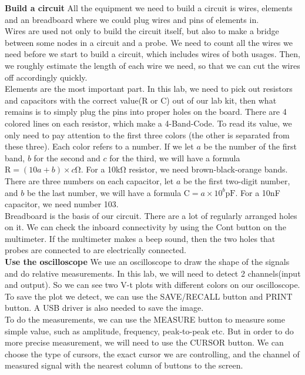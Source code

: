 \textbf{Build a circuit} \newline
\phantom{ } All the equipment we need to build a circuit is wires, elements and an breadboard where we could plug wires and pins of elements in.\\
\phantom{ } Wires are used not only to build the circuit itself, but also to make a bridge between some nodes in a circuit and a probe. We need to count all the wires we need before we start to build a circuit, which includes wires of both usages. Then, we roughly estimate the length of each wire we need, so that we can cut the wires off accordingly quickly.\\
\phantom{ } Elements are the most important part. In this lab, we need to pick out resistors and capacitors with the correct value(R or C) out of our lab kit, then what remains is to simply plug the pins into proper holes on the board. There are 4 colored lines on each resistor, which make a 4-Band-Code. To read its value, we only need to pay attention to the first three colors (the other is separated from these three). Each color refers to a number. If we let $a$ be the number of the first band, $b$ for the second and $c$ for the third, we will have a formula $\mathrm{R} = (10a+b)\times c\mathrm{\Omega}$. For a 10k$\mathrm{\Omega}$ resistor, we need brown-black-orange bands. There are three numbers on each capacitor, let $a$ be the first two-digit number, and $b$ be the last number, we will have a formula $\mathrm{C} = a \times 10^b \mathrm{pF}$. For a 10nF capacitor, we need number 103.\\
\phantom{ } Breadboard is the basis of our circuit. There are a lot of regularly arranged holes on it. We can check the inboard connectivity by using the Cont button on the multimeter. If the multimeter makes a beep sound, then the two holes that probes are connected to are electrically connected.\\
\textbf{Use the oscilloscope} \newline
\phantom{ } We use an oscilloscope to draw the shape of the signals and do relative measurements. In this lab, we will need to detect 2 channels(input and output). So we can see two V-t plots with different colors on our oscilloscope. To save the plot we detect, we can use the SAVE/RECALL button and PRINT button. A USB driver is also needed to save the image.\\
\phantom{ } To do the measurements, we can use the MEASURE button to measure some simple value, such as amplitude, frequency, peak-to-peak etc. But in order to do more precise measurement, we will need to use the CURSOR button. We can choose the type of cursors, the exact cursor we are controlling, and the channel of measured signal with the nearest column of buttons to the screen.\\
